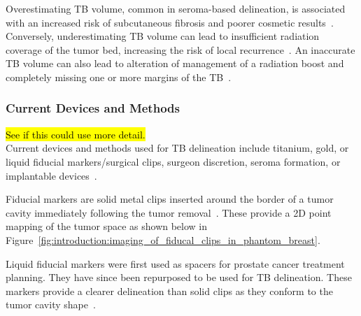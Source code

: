 Overestimating TB volume, common in seroma-based delineation, is associated with an increased risk of subcutaneous fibrosis and poorer cosmetic results~\cite{RefWorks:RefID:197-den2015postlumpectomy}. Conversely, underestimating TB volume can lead to insufficient radiation coverage of the tumor bed, increasing the risk of local recurrence~\cite{RefWorks:RefID:198-jiao2024interobserver}. An inaccurate TB volume can
also lead to alteration of management of a radiation boost and completely missing one or more margins of the TB~\cite{RefWorks:RefID:344-mitchell2019adaptable}.

\subsubsection{Current Devices and Methods\label{sec:introduction:motivation:currentdevicesandmethods}}
\hl{See if this could use more detail.\\}
Current devices and methods used for TB delineation include titanium, gold, or liquid fiducial markers/surgical clips, surgeon discretion, seroma formation, or implantable devices~\cite{RefWorks:RefID:25-acree2022review}.

Fiducial markers are solid metal clips inserted around the border of a tumor cavity immediately following the tumor removal~\cite{RefWorks:RefID:358-defining}. These provide a 2D point mapping of the tumor space as shown below in Figure~\ref{fig:introduction:imaging_of_fiducal_clips_in_phantom_breast}.

Liquid fiducial markers were first used as spacers for prostate cancer treatment planning. They have since been repurposed to be used for TB delineation. These markers provide a clearer delineation than solid clips as they conform to the tumor cavity shape~\cite{RefWorks:RefID:25-acree2022review}.

